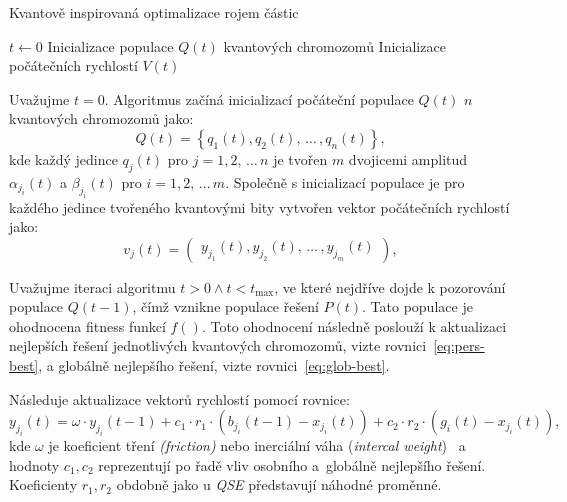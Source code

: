 \begin{algorithm}[ht]
    \caption{Kvantově inspirovaná optimalizace rojem částic}
    \label{alg:qipso}
    $t \gets 0$\;
    Inicializace populace $Q\left(t\right)$ kvantových chromozomů\;
    Inicializace počátečních rychlostí $V\left(t\right)$\;
\end{algorithm}

Uvažujme $t=0$. Algoritmus začíná inicializací počáteční populace $Q\left(t\right)$ $n$ kvantových chromozomů jako: 
\begin{equation*}
    Q\left(t\right) = \left\{q_1\left(t\right), q_2\left(t\right),\,\dots\,,q_n\left(t\right)\right\},
\end{equation*}
kde každý jedince $q_j\left(t\right)$ pro $j=1,2,\,\dots\,n$ je tvořen $m$ dvojicemi amplitud $\alpha_{j_i}\left(t\right)$ a $\beta_{j_i}\left(t\right)$ pro $i=1,2,\,\dots\,m$.
Společně s inicializací populace je pro každého jedince tvořeného kvantovými bity vytvořen vektor počátečních rychlostí jako:
\begin{equation*}
    v_j\left(t\right) = \begin{pmatrix} y_{j_1}\left(t\right), y_{j_2}\left(t\right),\,\dots\,, y_{j_m}\left(t\right) \end{pmatrix},
\end{equation*}

Uvažujme iteraci algoritmu $t>0 \wedge t<t_{\text{max}}$, ve které nejdříve dojde k pozorování populace $Q\left(t-1\right)$, čímž vznikne populace řešení $P\left(t\right)$. 
Tato populace je ohodnocena fitness funkcí $f\left(\right)$. 
Toto ohodnocení následně poslouží k aktualizaci nejlepších řešení jednotlivých kvantových chromozomů, vizte rovnici~\ref{eq:pers-best}, a globálně nejlepšího řešení, vizte rovnici~\ref{eq:glob-best}. 

Následuje aktualizace vektorů rychlostí pomocí rovnice:
\begin{equation*}
    y_{j_i}\left(t\right) = \omega \cdot y_{j_i}\left(t-1\right) + c_1 \cdot r_1 \cdot (b_{j_i}\left(t-1\right) - x_{j_i}\left(t\right)) + c_2 \cdot r_2 \cdot (g_i\left(t\right) - x_{j_i}\left(t\right)),
\end{equation*}
kde $\omega$ je koeficient tření \emph{(friction)} nebo inerciální váha (\emph{intercal weight})~\cite{PSO-c1c2w} a hodnoty $c_1,c_2$ reprezentují po řadě vliv osobního a~globálně nejlepšího řešení. 
Koeficienty $r_1, r_2$ obdobně jako u \emph{QSE} představují náhodné proměnné. 

